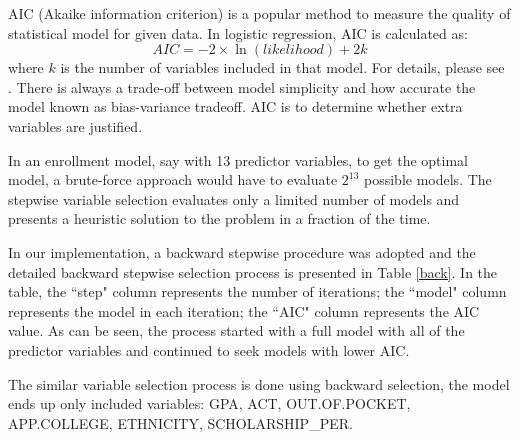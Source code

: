 \documentclass[12pt,english]{report}
\begin{document}
AIC (Akaike information criterion) is a popular method to measure the quality of statistical model for given data. In logistic regression, AIC is calculated as:
\begin{equation}
    AIC= -2 \times \ln(likelihood) + 2k
\end{equation}
where $k$ is the number of variables included in that model. For details,
please see  \citep{wagenmakers2004aic}. There is always a trade-off between model
simplicity and how accurate the model known as bias-variance tradeoff. AIC is to 
determine whether extra variables are justified.
     
In an enrollment model, say with 13 predictor variables, to get the optimal
model, a brute-force approach would have to evaluate $2^{13}$ possible models.
The stepwise variable selection evaluates only a limited number of models and
presents a heuristic solution to the problem in a fraction of the time.

In our implementation, a backward stepwise procedure was adopted and the
detailed backward stepwise selection process is presented in Table \ref{back}.
In the table, the ``step" column represents the number of iterations; the
``model" column represents the model in each iteration; the ``AIC" column
represents the AIC value.  As can be seen, the process started with a full
model with all of the predictor variables and continued to seek models with
lower AIC.


The similar variable selection process is done using backward selection, the
model ends up only included variables: GPA, ACT, OUT.OF.POCKET, APP.COLLEGE,
ETHNICITY, SCHOLARSHIP\_PER. 

\end{document}

